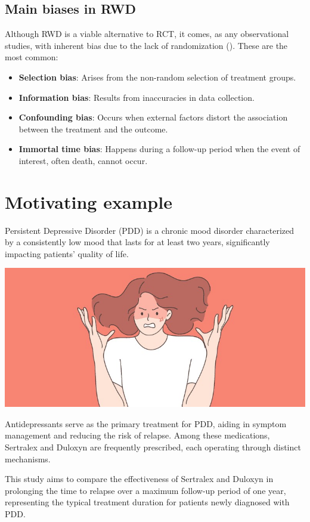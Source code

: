 \documentclass[
]{book}
\begin{document}
\section{Main biases in RWD}\label{main-biases-in-rwd}

Although RWD is a viable alternative to RCT, it comes, as any
observational studies, with inherent bias due to the lack of
randomization (). These are the
most common:

\begin{itemize}
\item
  \textbf{Selection bias}: Arises from the non-random selection of
  treatment groups.
\item
  \textbf{Information bias}: Results from inaccuracies in data
  collection.
\item
  \textbf{Confounding bias}: Occurs when external factors distort the
  association between the treatment and the outcome.
\item
  \textbf{Immortal time bias}: Happens during a follow-up period when
  the event of interest, often death, cannot occur.
\end{itemize}

\chapter{Motivating example}\label{motivating-example}

Persistent Depressive Disorder (PDD) is a chronic mood disorder
characterized by a consistently low mood that lasts for at least two
years, significantly impacting patients' quality of life.

\begin{center}\includegraphics[width=0.5\linewidth]{images/PDD} \end{center}

Antidepressants serve as the primary treatment for PDD, aiding in
symptom management and reducing the risk of relapse. Among these
medications, Sertralex and Duloxyn are frequently prescribed, each
operating through distinct mechanisms.

This study aims to compare the effectiveness of Sertralex and Duloxyn in
prolonging the time to relapse over a maximum follow-up period of one
year, representing the typical treatment duration for patients newly
diagnosed with PDD.
\end{document}
